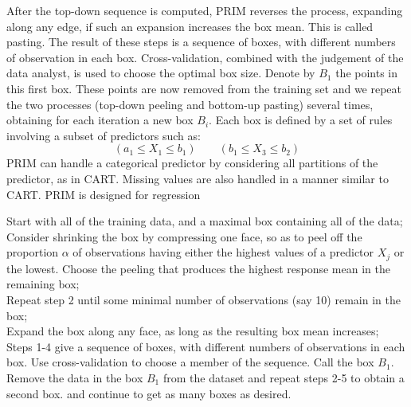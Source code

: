 After the top-down sequence is computed, PRIM reverses the process, expanding along any edge, if such an expansion increases the box mean. This is called pasting. The result of these steps is a sequence of boxes, with different numbers of observation in each box. Cross-validation, combined with the judgement of the data analyst, is used to choose the optimal box size. Denote by $B_1$ the points in this first box. These points are now removed from the training set and we repeat the two processes (top-down peeling and bottom-up pasting) several times, obtaining for each iteration a new box $B_i$. Each box is defined by a set of rules involving a subset of predictors such as:
\begin{equation}
(a_1 \le X_1 \le b_1) \quad\quad (b_1 \le X_3 \le b_2)
\end{equation}
PRIM can handle a categorical predictor by considering all partitions of the predictor, as in CART. Missing values are also handled in a manner similar to CART. PRIM is designed for regression

\begin{algorithm}[!ht]
Start with all of the training data, and a maximal box containing all of the data;\\

Consider shrinking the box by compressing one face, so as to peel off the proportion $\alpha$ of observations having either the highest values of a predictor $X_j$ or the lowest. Choose the peeling that produces the highest response mean in the remaining box;\\

Repeat step 2 until some minimal number of observations (say 10) remain in the box;\\

Expand the box along any face, as long as the resulting box mean increases;\\

Steps 1-4 give a sequence of boxes, with different numbers of observations in each box. Use cross-validation to choose a member of the sequence. Call the box $B_1$.\\

Remove the data in the box $B_1$ from the dataset and repeat steps 2-5 to obtain a second box. and continue to get as many boxes as desired.
\end{algorithm}

